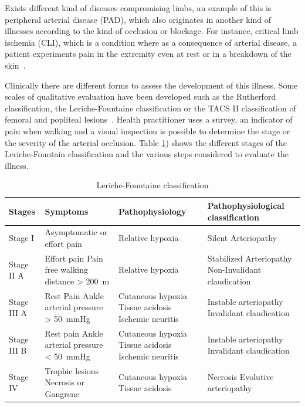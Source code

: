 Exists different kind of diseases compromising limbs, an example of this is peripheral arterial disease (PAD), which also originates in another kind of illnesses according to the kind of occlusion or blockage. For instance, critical limb ischemia (CLI), which is a condition where as a consequence of arterial disease, a patient experiments pain in the extremity even at rest or in a breakdown of the skin~\cite{novo2004critical}. 

Clinically there are different forms to assess the development of this illness. Some scales of qualitative evaluation have been developed such as the Rutherford classification, the Leriche-Fountaine classification or the TACS II classification of femoral and popliteal lesions~\cite{norgren2007inter}. Health practitioner uses a survey, an indicator of pain when walking and a visual inspection is possible to determine the stage or the severity of the arterial occlusion.  Table \ref{table:Fountaine}) shows the different stages of the Leriche-Fountain classification and the various steps considered to evaluate the illness.

\begin{table}
\caption{Leriche-Fountaine classification}
\centering
\label{table:Fountaine}
\begin{tabular}{p{1.8cm} p{3.8cm} p{3.5cm} p{4.5cm}}
\toprule
\textbf{Stages}& \textbf{Symptoms} & \textbf{Pathophysiology} & \textbf{Pathophysiological \newline classification} \\
\midrule
Stage I & Asymptomatic \newline or effort pain & Relative hypoxia & Silent Arteriopathy \\
\midrule
Stage II A & Effort pain \newline Pain free walking distance > \SI{200}{\meter} & Relative hypoxia & Stabilized Arteriopathy \newline Non-Invalidant claudication \\ 
\midrule
Stage III A & Rest Pain \newline Ankle arterial pressure > \SI{50}{\mmHg} & Cutaneous hypoxia \newline Tissue acidosis \newline Ischemic neuritis & Instable arteriopathy \newline Invalidant claudication \\
\midrule
Stage III B & Rest pain \newline Ankle arterial pressure < \SI{50}{\mmHg} & Cutaneous hypoxia \newline Tissue acidosis \newline Ischemic neuritis & Instable arteriopathy \newline
Invalidant claudication \\
\midrule
Stage IV & Trophic lesions \newline Necrosis or Gangrene & Cutaneous hypoxia \newline 
Tissue acidosis & Necrosis \newline Evolutive arteriopathy \\
\bottomrule
\end{tabular}
\end{table}


